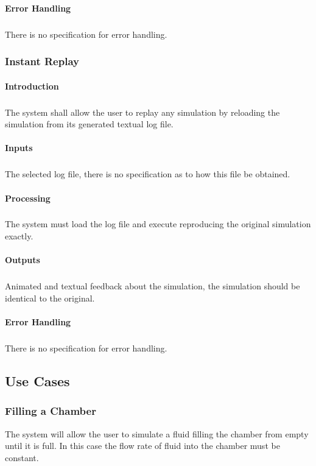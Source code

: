 \documentclass{scrartcl}
\begin{document}
\paragraph{Error Handling}
\subparagraph{}
There is no specification for error handling.


\subsubsection{Instant Replay}
\paragraph{Introduction}
\subparagraph{}
The system shall allow the user to replay any simulation by reloading the simulation from its generated textual log file. 

\paragraph{Inputs}
\subparagraph{}
The selected log file, there is no specification as to how this file be obtained.

\paragraph{Processing}
\subparagraph{}
The system must load the log file and execute reproducing the original simulation exactly.

\paragraph{Outputs}
\subparagraph{}
Animated and textual feedback about the simulation, the simulation should be identical to the original.

\paragraph{Error Handling}
\subparagraph{}
There is no specification for error handling.



\subsection{Use Cases}
\subsubsection{Filling a Chamber}
The system will allow the user to simulate a fluid filling the chamber from empty until it is full. In this case the flow rate of fluid into the chamber must be constant.  
\end{document}
